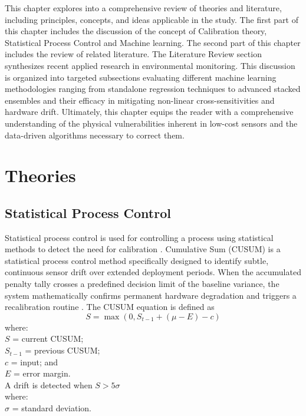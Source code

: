 This chapter explores into a comprehensive review of theories and literature, including principles, concepts, and ideas applicable in the study. The first part of this chapter includes the discussion of the concept of Calibration theory, Statistical Process Control and Machine learning. The second part of this chapter includes the review of related literature. The Literature Review section synthesizes recent applied research in environmental monitoring. This discussion is organized into targeted subsections evaluating different machine learning methodologies ranging from standalone regression techniques to advanced stacked ensembles and their efficacy in mitigating non-linear cross-sensitivities and hardware drift. Ultimately, this chapter equips the reader with a comprehensive understanding of the physical vulnerabilities inherent in low-cost sensors and the data-driven algorithms necessary to correct them. 

\section{Theories}
\subsection{Statistical Process Control}
Statistical process control is used for controlling a process using statistical methods to detect the need for calibration \cite{Okafor_2020}. Cumulative Sum (CUSUM) is a statistical process control method specifically designed to identify subtle, continuous sensor drift over extended deployment periods. When the accumulated penalty tally crosses a predefined decision limit of the baseline variance, the system mathematically confirms permanent hardware degradation and triggers a recalibration routine \cite{Benkova_2023}. The CUSUM equation is defined as \cite{Estaji_January2024}
\begin{equation}
	S = \max(0, S_{t-1} + (\mu - E) - c)
	\label{eq:cusum}
\end{equation}
\noindent where: \\[2pt]
$S$ = current CUSUM; \\
$S_{t-1}$ = previous CUSUM; \\
$c$ = input; and \\
$E$ = error margin. \\[12pt]

A drift is detected when $S > 5\sigma$ \\[2pt]
\noindent where: \\[2pt]
$\sigma$ = standard deviation. \\


